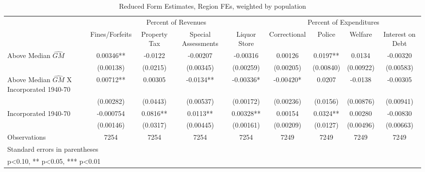 \begin{table}[htbp]\centering
\def\sym#1{\ifmmode^{#1}\else\(^{#1}\)\fi}
\caption{Reduced Form Estimates, Region FEs, weighted by population}
\begin{tabular}{l*{8}{c}}
\toprule
                    &\multicolumn{4}{c}{Percent of Revenues}                        &\multicolumn{4}{c}{Percent of Expenditures}                    \\\cmidrule(lr){2-5}\cmidrule(lr){6-9}
                    &\multicolumn{1}{c}{Fines/Forfeits}&\multicolumn{1}{c}{Property Tax}&\multicolumn{1}{c}{Special Assessments}&\multicolumn{1}{c}{Liquor Store}&\multicolumn{1}{c}{Correctional}&\multicolumn{1}{c}{Police}&\multicolumn{1}{c}{Welfare}&\multicolumn{1}{c}{Interest on Debt}\\
\midrule
Above Median $\widehat{GM}$&     0.00346** &     -0.0122   &    -0.00207   &    -0.00316   &     0.00126   &      0.0197** &      0.0134   &    -0.00320   \\
                    &   (0.00138)   &    (0.0215)   &   (0.00345)   &   (0.00259)   &   (0.00205)   &   (0.00840)   &   (0.00922)   &   (0.00583)   \\
\addlinespace
Above Median $\widehat{GM}$ X Incorporated 1940-70&     0.00712** &     0.00305   &     -0.0134** &    -0.00336*  &    -0.00420*  &      0.0207   &     -0.0138   &    -0.00305   \\
                    &   (0.00282)   &    (0.0443)   &   (0.00537)   &   (0.00172)   &   (0.00236)   &    (0.0156)   &   (0.00876)   &   (0.00941)   \\
\addlinespace
Incorporated 1940-70&   -0.000754   &      0.0816** &      0.0113** &     0.00328** &     0.00154   &      0.0324** &     0.00280   &    -0.00830   \\
                    &   (0.00146)   &    (0.0317)   &   (0.00445)   &   (0.00161)   &   (0.00209)   &    (0.0127)   &   (0.00496)   &   (0.00663)   \\
\midrule
Observations        &        7254   &        7254   &        7254   &        7254   &        7249   &        7249   &        7249   &        7249   \\
\bottomrule
\multicolumn{9}{l}{\footnotesize Standard errors in parentheses}\\
\multicolumn{9}{l}{\footnotesize * p<0.10, ** p<0.05, *** p<0.01}\\
\end{tabular}
\end{table}
